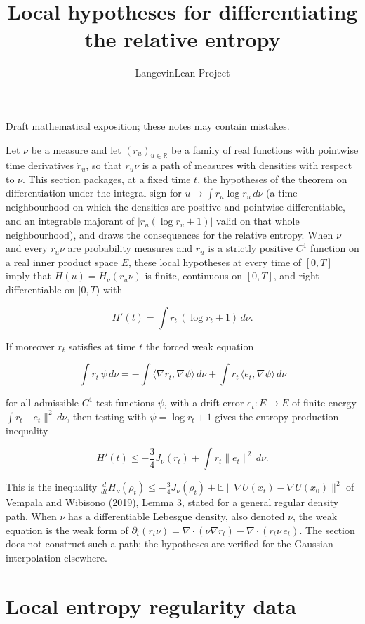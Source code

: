 \documentclass[11pt,a4paper]{article}
\title{\texorpdfstring{Local hypotheses for differentiating the relative entropy}{Local hypotheses for differentiating the relative entropy}}
\author{LangevinLean Project}
\date{}
\begin{document}
\maketitle
Draft mathematical exposition; these notes may contain mistakes.


Let \(\nu\) be a measure and let \((r_u)_{u\in\mathbb R}\) be a family of real functions with pointwise time derivatives \(\dot r_u\), so that \(r_u\nu\) is a path of measures with densities with respect to \(\nu\). This section packages, at a fixed time \(t\), the hypotheses of the theorem on differentiation under the integral sign for \(u\mapsto\int r_u\log r_u\,d\nu\) (a time neighbourhood on which the densities are positive and pointwise differentiable, and an integrable majorant of \(|\dot r_u(\log r_u+1)|\) valid on that whole neighbourhood), and draws the consequences for the relative entropy. When \(\nu\) and every \(r_u\nu\) are probability measures and \(r_u\) is a strictly positive \(C^1\) function on a real inner product space \(E\), these local hypotheses at every time of \([0,T]\) imply that \(H(u)=H_\nu(r_u\nu)\) is finite, continuous on \([0,T]\), and right-differentiable on \([0,T)\) with


\[H'(t)=\int\dot r_t\,(\log r_t+1)\,d\nu.\]


If moreover \(r_t\) satisfies at time \(t\) the forced weak equation


\[\int\dot r_t\,\psi\,d\nu=-\int\langle\nabla r_t,\nabla\psi\rangle\,d\nu+\int r_t\,\langle e_t,\nabla\psi\rangle\,d\nu\]


for all admissible \(C^1\) test functions \(\psi\), with a drift error \(e_t:E\to E\) of finite energy \(\int r_t\|e_t\|^2\,d\nu\), then testing with \(\psi=\log r_t+1\) gives the entropy production inequality


\[H'(t)\le-\frac34J_\nu(r_t)+\int r_t\|e_t\|^2\,d\nu.\]


This is the inequality \(\frac{d}{dt}H_\nu(\rho_t)\le-\frac34J_\nu(\rho_t)+\mathbb E\|\nabla U(x_t)-\nabla U(x_0)\|^2\) of Vempala and Wibisono (2019), Lemma 3, stated for a general regular density path. When \(\nu\) has a differentiable Lebesgue density, also denoted \(\nu\), the weak equation is the weak form of \(\partial_t(r_t\nu)=\nabla\cdot(\nu\nabla r_t)-\nabla\cdot(r_t\nu\,e_t)\). The section does not construct such a path; the hypotheses are verified for the Gaussian interpolation elsewhere.


\section{\texorpdfstring{Local entropy regularity data}{Local entropy regularity data}}
\end{document}

